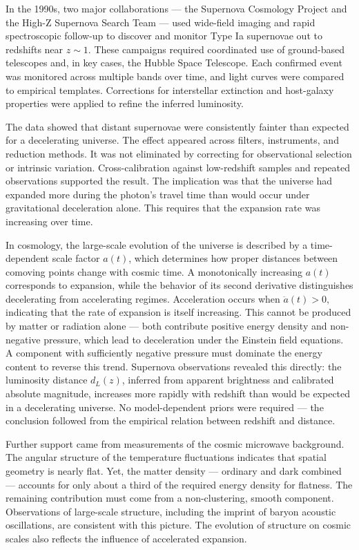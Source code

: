 In the 1990s, two major collaborations — the Supernova Cosmology Project and the High-Z Supernova Search Team — used wide-field imaging and rapid spectroscopic follow-up to discover and monitor Type Ia supernovae out to redshifts near $z \sim 1$. These campaigns required coordinated use of ground-based telescopes and, in key cases, the Hubble Space Telescope. Each confirmed event was monitored across multiple bands over time, and light curves were compared to empirical templates. Corrections for interstellar extinction and host-galaxy properties were applied to refine the inferred luminosity.

The data showed that distant supernovae were consistently fainter than expected for a decelerating universe. The effect appeared across filters, instruments, and reduction methods. It was not eliminated by correcting for observational selection or intrinsic variation. Cross-calibration against low-redshift samples and repeated observations supported the result. The implication was that the universe had expanded more during the photon’s travel time than would occur under gravitational deceleration alone. This requires that the expansion rate was increasing over time.

In cosmology, the large-scale evolution of the universe is described by a time-dependent scale factor $a(t)$, which determines how proper distances between comoving points change with cosmic time. A monotonically increasing $a(t)$ corresponds to expansion, while the behavior of its second derivative distinguishes decelerating from accelerating regimes. Acceleration occurs when $\ddot{a}(t) > 0, $ indicating that the rate of expansion is itself increasing. This cannot be produced by matter or radiation alone — both contribute positive energy density and non-negative pressure, which lead to deceleration under the Einstein field equations. A component with sufficiently negative pressure must dominate the energy content to reverse this trend. Supernova observations revealed this directly: the luminosity distance $d_L(z)$, inferred from apparent brightness and calibrated absolute magnitude, increases more rapidly with redshift than would be expected in a decelerating universe. No model-dependent priors were required — the conclusion followed from the empirical relation between redshift and distance.

Further support came from measurements of the cosmic microwave background. The angular structure of the temperature fluctuations indicates that spatial geometry is nearly flat. Yet, the matter density — ordinary and dark combined — accounts for only about a third of the required energy density for flatness. The remaining contribution must come from a non-clustering, smooth component. Observations of large-scale structure, including the imprint of baryon acoustic oscillations, are consistent with this picture. The evolution of structure on cosmic scales also reflects the influence of accelerated expansion.

